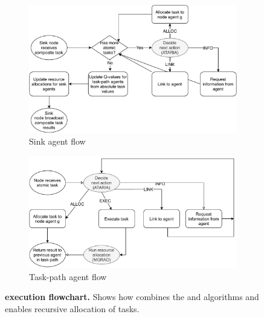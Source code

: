 \begin{figure}[ht]
	\centering
	\begin{subfigure}{.49\textwidth}
		\centering
		\includegraphics[width=0.9\linewidth, trim={25pt 0pt 25pt 0pt, clip}]{algorithm-flow-sink}
		\caption{Sink agent flow}
		\label{fig:algorithm-flow-sink}
	\end{subfigure} \hfill%
	\begin{subfigure}{.49\textwidth}
		\centering	\includegraphics[width=0.9\linewidth,trim={25pt 0pt 25pt 0pt, clip}]{algorithm-flow-arc}
		\caption{Task-path agent flow}
		\label{fig:algorithm-flow-arc}
	\end{subfigure}
	\caption{\textbf{\acronymWSNOptimisation{}{} execution flowchart.} Shows how \acronymWSNOptimisation{}{} combines the \acronymATARIA{}{} and \acronymMGRAO{}{} algorithms and enables recursive allocation of tasks.}
	\label{fig:algorithm-flow}
\end{figure}